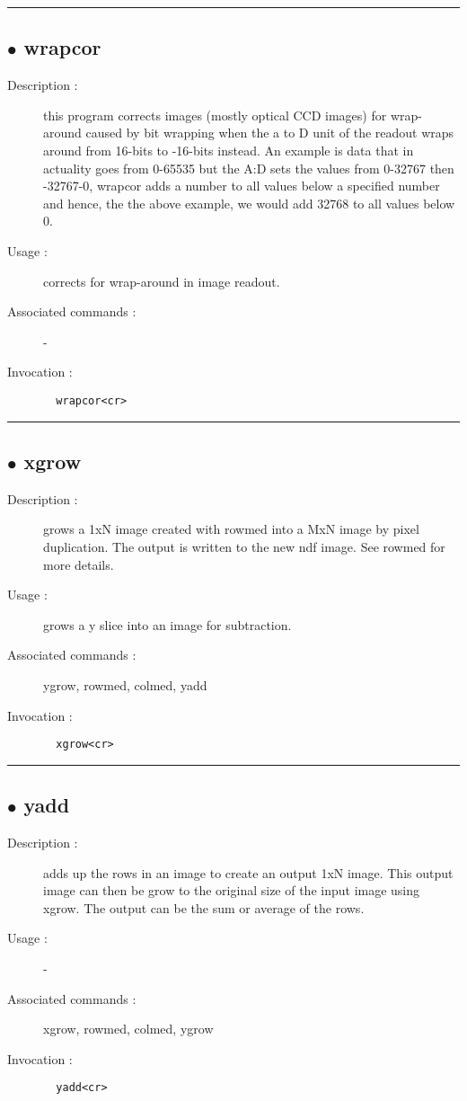 \hrule \subsection*{$\bullet$ wrapcor}
\begin{description}
\item[Description :] this program corrects images (mostly optical CCD images) for
wrap-around caused by bit wrapping when the a to D unit of the readout
wraps around from 16-bits to -16-bits instead.  An example is data that
in actuality goes from 0-65535 but the A:D sets the values from 0-32767
then -32767-0, wrapcor adds a number to all values below a specified
number and hence, the the above example, we would add 32768 to all values
below 0.
\item[Usage :] corrects for wrap-around in image readout.
\item[Associated commands :] -
\item[Invocation :]

\verb+  wrapcor<cr> +\end{description}

\hrule \subsection*{$\bullet$ xgrow}
\begin{description}
\item[Description :] grows a 1xN image created with rowmed into a MxN image by pixel
duplication.  The output is written to the new ndf image.  See rowmed
for more details.
\item[Usage :] grows a y slice into an image for subtraction.
\item[Associated commands :] ygrow, rowmed, colmed, yadd
\item[Invocation :]

\verb+  xgrow<cr> +\end{description}

\hrule \subsection*{$\bullet$ yadd}
\begin{description}
\item[Description :] adds up the rows in an image to create an output 1xN image.  This
output image can then be grow to the original size of the input image
using xgrow.  The output can be the sum or average of the rows.
\item[Usage :] -
\item[Associated commands :] xgrow, rowmed, colmed, ygrow
\item[Invocation :]

\verb+  yadd<cr> +\end{description}


